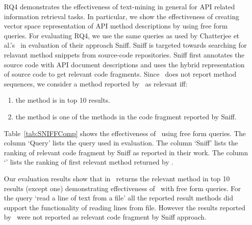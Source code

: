 RQ4 demonstrates the effectiveness of text-mining in general for API related information retrieval tasks.
In particular, we show the effectiveness of creating vector space representation of
API method descriptions by using free form queries.
For evaluating RQ4, we use the same queries as used by Chatterjee et al.'s~\cite{chatterjee2009sniff} in evaluation of their approach Sniff.
Sniff is targeted towards searching for relavant method snippets from source-code repositories. Sniff first annotates the source code with API document descriptions and uses the hybrid representation of source code to get relevant code fragments. 
Since \tool\ does not report method sequences, we consider a method reported by \tool\ as relevant iff:

\begin{enumerate}
	\item the method is in top 10 results.
	\item the method is one of the methods in the code fragment reported by Sniff.
\end{enumerate}

Table~\ref{tab:SNIFFComp} shows the effectiveness of \tool\ using free form queries.
The column `Query' lists the query used in evaluation.
The column `Sniff' lists the ranking of relevant code fragment by Sniff as reported in their work.
The column `\tool' lists the ranking of first relevant method returned by \tool.


Our evaluation results show that in \tool\ returns the relevant method in top 10 results (except one) demonstrating effectiveness of \tool\ with free form queries.
For the query `read a line of text from a file' all the reported result methods did support the functionality of reading lines from file.
However the results reported by \tool\ were not reported as relevant code fragment by Sniff approach.

